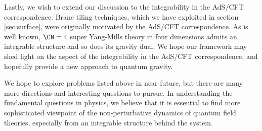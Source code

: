 Lastly, we wish to extend our discussion to the integrability in
the AdS/CFT correspondence.
Brane tiling techniques, which we have exploited in section \ref{sec:surface},
were originally motivated by the AdS/CFT correspondence.
As is well known, $\CN=4$ super Yang-Mills theory in four dimensions admits
an integrable structure and so does its gravity dual.
We hope our framework may shed light on the aspect of the integrability
in the AdS/CFT correspondence, and hopefully provide a new approach to quantum
gravity.



We hope to explore problems listed above in near future,
but there are many more directions and interesting questions to pursue.
In understanding the fundamental questions in physics, we believe that
it is essential to find more sophisticated viewpoint of the non-perturbative dynamics
of quantum field theories, especially from an integrable structure behind the system.









